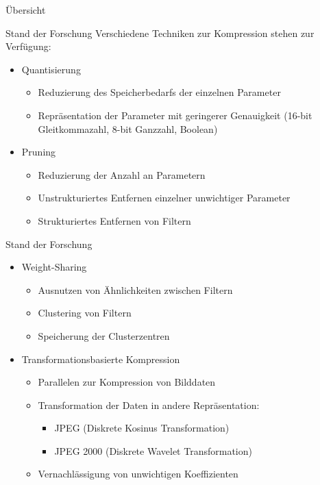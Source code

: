 \documentclass[aspectratio=169, 12pt]{beamer}
\begin{document}
\begin{frame}{Übersicht}
  \tableofcontents[currentsection]
\end{frame}

\begin{frame}{Stand der Forschung}
  Verschiedene Techniken zur Kompression stehen zur Verfügung:

  \begin{itemize}
    \item Quantisierung
          \begin{itemize}
            \item Reduzierung des Speicherbedarfs der einzelnen Parameter
            \item Repräsentation der Parameter mit geringerer Genauigkeit (16-bit Gleitkommazahl, 8-bit Ganzzahl, Boolean)
          \end{itemize}
    \item Pruning
          \begin{itemize}
            \item Reduzierung der Anzahl an Parametern
            \item Unstrukturiertes Entfernen einzelner unwichtiger Parameter
            \item Strukturiertes Entfernen von Filtern
          \end{itemize}
  \end{itemize}
\end{frame}

\begin{frame}{Stand der Forschung}
  \begin{itemize}
    \item Weight-Sharing
          \begin{itemize}
            \item Ausnutzen von Ähnlichkeiten zwischen Filtern
            \item Clustering von Filtern
            \item Speicherung der Clusterzentren
          \end{itemize}
    \item Transformationsbasierte Kompression
          \begin{itemize}
            \item Parallelen zur Kompression von Bilddaten
            \item Transformation der Daten in andere Repräsentation:
                  \begin{itemize}
                    \item JPEG (Diskrete Kosinus Transformation)
                    \item JPEG 2000 (Diskrete Wavelet Transformation)
                  \end{itemize}
            \item Vernachlässigung von unwichtigen Koeffizienten
          \end{itemize}
  \end{itemize}
\end{frame}
\end{document}
